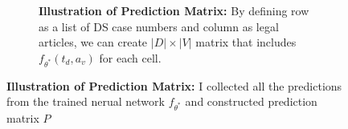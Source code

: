\begin{figure}[!tbp]
\begin{subfigure}[b]{0.49\textwidth}
\begin{tikzpicture}
        \end{tikzpicture} 
        \label{fig:illutrate-preds}      
        \caption{\textbf{Illustration of Prediction Matrix:} By defining row as a list of DS case numbers and column as legal articles, we can create $|D| \times |V|$ matrix that includes $f_{\theta^*}(t_d, a_v)$ for each cell.}    
    \end{subfigure}
    \hfill
    \begin{subfigure}[b]{0.49\textwidth}
    \end{subfigure}
    \caption{\textbf{Illustration of Prediction Matrix:} I collected all the predictions from the trained nerual network $f_{\theta^*}$ and constructed prediction matrix $P$}
    \label{fig:illutrate-preds}
  \end{figure}
  